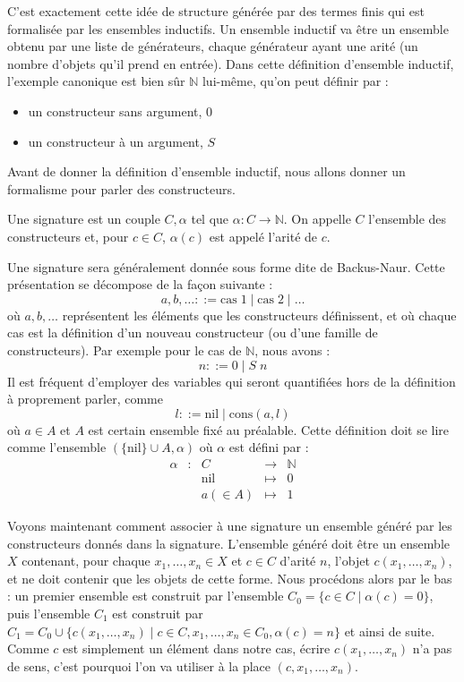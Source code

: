 C'est exactement cette idée de structure générée par des termes finis qui est
formalisée par les ensembles inductifs. Un ensemble inductif va être un ensemble
obtenu par une liste de générateurs, chaque générateur ayant une arité (un
nombre d'objets qu'il prend en entrée). Dans cette définition d'ensemble
inductif, l'exemple canonique est bien sûr $\mathbb N$ lui-même, qu'on peut
définir par :
\begin{itemize}
\item un constructeur sans argument, $0$
\item un constructeur à un argument, $S$
\end{itemize}

Avant de donner la définition d'ensemble inductif, nous allons donner un
formalisme pour parler des constructeurs.

\begin{definition}[Signature]
  Une signature est un couple $C,\alpha$ tel que $\alpha : C \to \mathbb N$.
  On appelle $C$ l'ensemble des constructeurs et, pour $c \in C$, $\alpha(c)$
  est appelé l'arité de $c$.
\end{definition}

Une signature sera généralement donnée sous forme dite de Backus-Naur. Cette
présentation se décompose de la façon suivante :
$$a,b,\ldots ::= \mathrm{cas}\;1 \mid \mathrm{cas}\;2 \mid \ldots$$
où $a,b,\ldots$ représentent les éléments que les constructeurs définissent,
et où chaque cas est la définition d'un nouveau constructeur (ou d'une famille
de constructeurs). Par exemple pour le cas de $\mathbb N$, nous avons :
$$n ::= 0 \mid S\;n$$
Il est fréquent d'employer des variables qui seront quantifiées hors de la
définition à proprement parler, comme
$$l ::= \mathrm{nil} \mid \mathrm{cons}(a,l)$$
où $a \in A$ et $A$ est certain ensemble fixé au préalable. Cette définition
doit se lire comme l'ensemble $(\{\mathrm{nil}\} \cup A,\alpha)$ où $\alpha$
est défini par :
$$
\begin{array}{rcccl}
  \alpha &:& C & \longrightarrow & \mathbb N\\
  & & \mathrm{nil} & \longmapsto & 0 \\
  & & a (\in A) & \longmapsto & 1
\end{array}
$$

Voyons maintenant comment associer à une signature un ensemble généré par les
constructeurs donnés dans la signature. L'ensemble généré doit être un ensemble
$X$ contenant, pour chaque $x_1,\ldots,x_n \in X$ et $c \in C$ d'arité $n$,
l'objet $c(x_1,\ldots,x_n)$, et ne doit contenir que les objets de cette forme.
Nous procédons alors par le bas : un premier ensemble est construit par
l'ensemble $C_0 = \{ c \in C \mid \alpha(c) = 0\}$, puis l'ensemble $C_1$ est
construit par $C_1 = C_0 \cup \{ c(x_1,\ldots,x_n) \mid c \in C, x_1,\ldots,
x_n \in C_0, \alpha(c) = n\}$ et ainsi de suite. Comme $c$ est simplement un
élément dans notre cas, écrire $c(x_1,\ldots,x_n)$ n'a pas de sens, c'est
pourquoi l'on va utiliser à la place $(c,x_1,\ldots,x_n)$.


